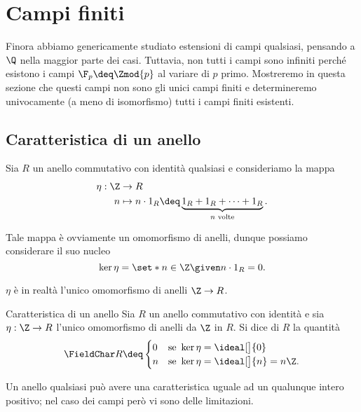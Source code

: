 \section{Campi finiti}

Finora abbiamo genericamente studiato estensioni di campi qualsiasi, pensando a $\Q$ nella maggior parte dei casi. Tuttavia, non tutti i campi sono infiniti perché esistono i campi $\F_p \deq \Zmod{p}$ al variare di $p$ primo. Mostreremo in questa sezione che questi campi non sono gli unici campi finiti e determineremo univocamente (a meno di isomorfismo) tutti i campi finiti esistenti.

\subsection{Caratteristica di un anello}

Sia $R$ un anello commutativo con identità qualsiasi e consideriamo la mappa \begin{align*}
    \eta: \Z &\to R \\
    n &\mapsto n \cdot 1_R \deq \underbrace{1_R + 1_R + \dots + 1_R}_{n \text{ volte}}.
\end{align*}

Tale mappa è ovviamente un omomorfismo di anelli, dunque possiamo considerare il suo nucleo \[
    \ker \eta = \set*{n \in \Z \given n \cdot 1_R = 0}.
\]

\begin{remark}
    $\eta$ è in realtà l'unico omomorfismo di anelli $\Z \to R$.
\end{remark}

\begin{definition}
    {Caratteristica di un anello}{}
    Sia $R$ un anello commutativo con identità e sia $\eta : \Z \to R$ l'unico omomorfismo di anelli da $\Z$ in $R$. 
    Si dice  di $R$ la quantità \[
        \FieldChar R \deq \begin{cases}
            0 &\text{se } \ker \eta = \ideal[\big]{0}\\
            n &\text{se } \ker \eta = \ideal[\big]{n} = n\Z.
        \end{cases}
    \]
\end{definition}

Un anello qualsiasi può avere una caratteristica uguale ad un qualunque intero positivo; nel caso dei campi però vi sono delle limitazioni.

